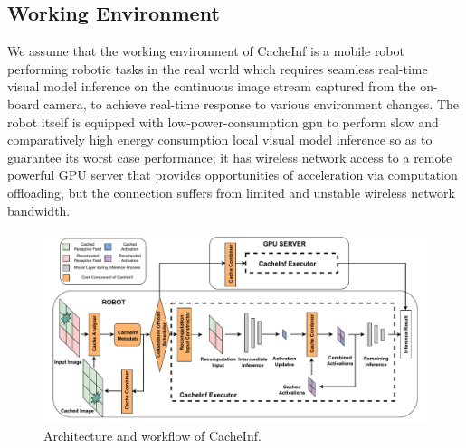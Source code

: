 
\subsection{Working Environment}
We assume that the working environment of CacheInf is a mobile robot performing robotic tasks in the real world which requires seamless real-time visual model inference on the continuous image stream captured from the on-board camera, to achieve real-time response to various environment changes.
The robot itself is equipped with low-power-consumption gpu to perform slow and comparatively high energy consumption local visual model inference so as to guarantee its worst case performance; it has wireless network access to a remote powerful GPU server that provides opportunities of acceleration via computation offloading, but the connection suffers from limited and unstable wireless network bandwidth.


\begin{figure}[!htb]
    \centering
    \includegraphics[width=\linewidth]{fig/overview_new_new.drawio.pdf}
    \caption[track]{Architecture and workflow of CacheInf. }
    \label{fig:overview}
\end{figure}


